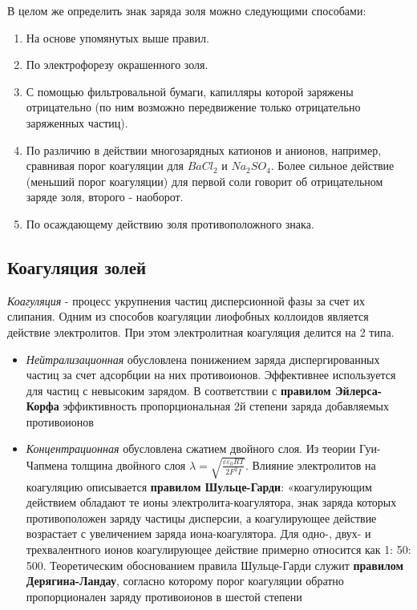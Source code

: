 \documentclass[a4paper, 12pt]{article}
\begin{document}
В целом же определить знак заряда золя можно следующими способами:
\begin{enumerate}
    \item На основе упомянутых выше правил.
    \item По электрофорезу окрашенного золя.
    \item С помощью фильтровальной бумаги, капилляры которой заряжены отрицательно (по ним возможно передвижение только отрицательно заряженных частиц).
    \item По различию в действии многозарядных катионов и анионов, например, сравнивая
порог коагуляции для $BaCl_{2}$ и $Na_{2}SO_{4}$. Более сильное действие (меньший порог
коагуляции) для первой соли говорит об отрицательном заряде золя, второго -
наоборот.
    \item По осаждающему действию золя противоположного знака.
\end{enumerate}


\subsection{Коагуляция золей}
\textit{Коагуляция} - процесс укрупнения частиц дисперсионной фазы за счет их слипания. Одним из способов коагуляции лиофобных коллоидов является действие электролитов. При этом электролитная коагуляция делится на 2 типа.
\begin{itemize}
    \item \textit{Нейтрализационная} обусловлена понижением заряда диспергированных частиц за счет адсорбции на них противоионов. Эффективнее используется для частиц с невысоким зарядом. В соответствии с \textbf{правилом  Эйлерса-Корфа} эффиктивность пропорциональная 2й степени заряда добавляемых противоионов
    \item \textit{Концентрационная} обусловлена сжатием двойного слоя. Из теории Гуи-Чапмена толщина двойного слоя $\lambda=\sqrt{\frac{\varepsilon \varepsilon_{0} R T}{2 F^{2} I}}$. Влияние электролитов на коагуляцию описывается \textbf{правилом Шульце-Гарди}: «коагулирующим действием обладают те ионы электролита-коагулятора, знак заряда которых противоположен заряду частицы дисперсии, а коагулирующее действие возрастает с увеличением заряда иона-коагулятора. Для одно-, двух- и трехвалентного ионов коагулирующее действие примерно относится как 1: 50: 500. Теоретическим обоснованием правила Шульце-Гарди служит \textbf{правилом Дерягина-Ландау}, согласно которому порог коагуляции обратно пропорционален заряду противоионов в шестой степени
\end{itemize}
\end{document}
